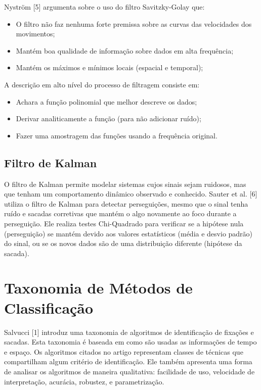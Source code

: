 \documentclass[brazil,]{report}
\begin{document}
Nyström {[}5{]} argumenta sobre o uso do filtro Savitzky-Golay que:

\begin{itemize}
\itemsep1pt\parskip0pt
\item
  O filtro não faz nenhuma forte premissa sobre as curvas das
  velocidades dos movimentos;
\item
  Mantém boa qualidade de informação sobre dados em alta frequência;
\item
  Mantém os máximos e mínimos locais (espacial e temporal);
\end{itemize}

A descrição em alto nível do processo de filtragem consiste em:

\begin{itemize}
\itemsep1pt\parskip0pt
\item
  Achara a função polinomial que melhor descreve os dados;
\item
  Derivar analiticamente a função (para não adicionar ruído);
\item
  Fazer uma amostragem das funções usando a frequência original.
\end{itemize}

\section{Filtro de Kalman}\label{filtro-de-kalman}

O filtro de Kalman permite modelar sistemas cujos sinais sejam ruidosos,
mas que tenham um comportamento dinâmico observado e conhecido. Sauter
et al. {[}6{]} utiliza o filtro de Kalman para detectar perseguições,
mesmo que o sinal tenha ruído e sacadas corretivas que mantém o algo
novamente ao foco durante a perseguição. Ele realiza testes Chi-Quadrado
para verificar se a hipótese nula (perseguição) se mantém devido aos
valores estatísticos (média e desvio padrão) do sinal, ou se os novos
dados são de uma distribuição diferente (hipótese da sacada).

\chapter{Taxonomia de Métodos de
Classificação}\label{taxonomia-de-muxe9todos-de-classificauxe7uxe3o}

Salvucci {[}1{]} introduz uma taxonomia de algoritmos de identificação
de fixações e sacadas. Esta taxonomia é baseada em como são usadas as
informações de tempo e espaço. Os algoritmos citados no artigo
representam classes de técnicas que compartilham algum critério de
identificação. Ele também apresenta uma forma de analisar os algoritmos
de maneira qualitativa: facilidade de uso, velocidade de interpretação,
acurácia, robustez, e parametrização.
\end{document}
